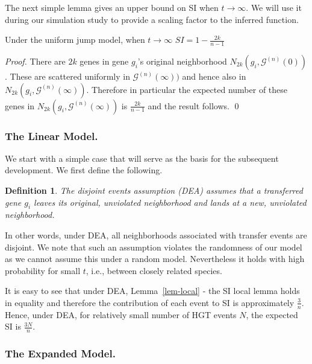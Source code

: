 \documentclass[runningheads, 11pt]{llncs}
\newtheorem{defn}[thm]{Definition}
\newcommand{\G}{\mathcal{G}^{(n)}}
\begin{document}
The next simple lemma gives an upper bound on SI when $t\rightarrow \infty$. We
will use it during our simulation study to provide a scaling factor to the
inferred function.
\begin{lemma}
\label{lem-SI-upper-bound}

Under the uniform jump model, when $t\rightarrow \infty$
$SI= 1-\frac {2k}{n-1} $
\end{lemma}
\begin {proof}
There are $2k$ genes in gene $g_i$'s original neighborhood $N_{2k}(g_i,\G(0))$.
These are scattered uniformly in $\G(\infty))$ and hence also in
$N_{2k}(g_i,\G(\infty))$. Therefore in particular the expected number of these
genes in $N_{2k} ( g_i,\G(\infty) )$ is $\frac {2k}{n-1} $ and the result
follows. \qed
\end {proof}


\subsubsection{The Linear Model.}

We start with a simple case that will serve as the basis for the subsequent
development. We first define the following.
\begin{defn} 
\label{def-DEA}
The {\em disjoint events assumption} (DEA) assumes that a transferred gene $g_i$
leaves its original, unviolated neighborhood and lands at a new, unviolated
neighborhood.
\end{defn} 
In other words, under DEA, all neighborhoods associated with transfer events are
disjoint. We note that such an assumption violates the randomness of our model
as we cannot assume this under a random model. Nevertheless it holds with high
probability for small $t$, i.e., between closely related species. 

It is easy to see that under DEA, Lemma~\ref{lem-local} - the SI local lemma
holds in equality and therefore the contribution of each event to SI is
approximately $\frac 3n$. Hence, under DEA, for relatively small number of HGT
events $N$, the expected SI is $\frac {3N}n$.


\subsubsection{The Expanded Model.} 
\end{document}
